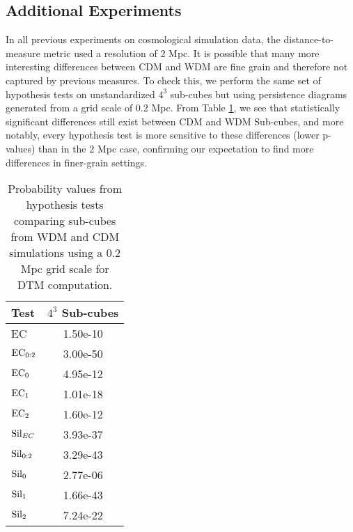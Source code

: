 \documentclass[12pt]{article}
\begin{document}
\subsection{Additional Experiments}

In all previous experiments on cosmological simulation data, the distance-to-measure metric used a resolution of 2 Mpc. It is possible that many more interesting differences between CDM and WDM are fine grain and therefore not captured by previous measures. To check this, we perform the same set of hypothesis tests on unstandardized $4^{3}$ sub-cubes but using persistence diagrams generated from a grid scale of 0.2 Mpc. From Table \ref{table:cosmo-0.2mpc-tests}, we see that statistically significant differences still exist between CDM and WDM Sub-cubes, and more notably, every hypothesis test is more sensitive to these differences (lower p-values) than in the 2 Mpc case, confirming our expectation to find more differences in finer-grain settings.

\begin{table}[htp!]
    \centering
    \begin{tabular}{l | c }
        \toprule
        Test & $4^3$ Sub-cubes \\
        \hline
        EC & 1.50e-10 \\
        $\textup{EC}_{0:2}$ & 3.00e-50 \\
        $\textup{EC}_{0}$ & 4.95e-12 \\
        $\textup{EC}_{1}$ & 1.01e-18 \\
        $\textup{EC}_{2}$ & 1.60e-12 \\
        $\textup{Sil}_{EC}$ & 3.93e-37 \\
        $\textup{Sil}_{0:2}$ & 3.29e-43 \\
        $\textup{Sil}_{0}$ & 2.77e-06 \\
        $\textup{Sil}_{1}$ & 1.66e-43 \\
        $\textup{Sil}_{2}$ & 7.24e-22 \\
        \bottomrule
    \end{tabular}
    \caption{Probability values from hypothesis tests comparing sub-cubes from WDM and CDM simulations using a 0.2 Mpc grid scale for DTM computation.}
    \label{table:cosmo-0.2mpc-tests}
\end{table}
\end{document}
